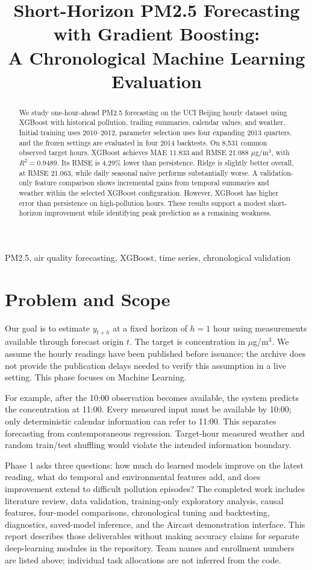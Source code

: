 \documentclass[conference]{IEEEtran}
\title{Short-Horizon PM2.5 Forecasting with Gradient Boosting:\\A Chronological Machine Learning Evaluation}
\author{\IEEEauthorblockA{\begin{tabular}{ccc}
\textbf{Samarth Khera} & \textbf{Pratham Malhotra} & \textbf{Adityaraj Pal}\\
2401010407 & 2401010343 & 2401010042\\[5pt]
\textbf{Tattva Rajput} & \textbf{Himanshu} & \\
2401010478 & 2401010188 &
\end{tabular}}\IEEEauthorblockA{CSAI Student Project 19 --- Phase 1: Machine Learning}}
\begin{document}
\maketitle
\thispagestyle{plain}
\begin{abstract}
We study one-hour-ahead PM2.5 forecasting on the UCI Beijing hourly dataset using XGBoost with historical pollution, trailing summaries, calendar values, and weather. Initial training uses 2010--2012, parameter selection uses four expanding 2013 quarters, and the frozen settings are evaluated in four 2014 backtests. On 8,531 common observed target hours, XGBoost achieves MAE 11.833 and RMSE 21.088 $\mu$g/m$^3$, with $R^2=0.9489$. Its RMSE is 4.29\% lower than persistence. Ridge is slightly better overall, at RMSE 21.063, while daily seasonal naive performs substantially worse. A validation-only feature comparison shows incremental gains from temporal summaries and weather within the selected XGBoost configuration. However, XGBoost has higher error than persistence on high-pollution hours. These results support a modest short-horizon improvement while identifying peak prediction as a remaining weakness.
\end{abstract}
\begin{IEEEkeywords}
PM2.5, air quality forecasting, XGBoost, time series, chronological validation
\end{IEEEkeywords}

\section{Problem and Scope}
Our goal is to estimate $y_{t+h}$ at a fixed horizon of $h=1$ hour using measurements available through forecast origin $t$. The target is concentration in $\mu$g/m$^3$. We assume the hourly readings have been published before issuance; the archive does not provide the publication delays needed to verify this assumption in a live setting. This phase focuses on Machine Learning.

For example, after the 10:00 observation becomes available, the system predicts the concentration at 11:00. Every measured input must be available by 10:00; only deterministic calendar information can refer to 11:00. This separates forecasting from contemporaneous regression. Target-hour measured weather and random train/test shuffling would violate the intended information boundary.

Phase 1 asks three questions: how much do learned models improve on the latest reading, what do temporal and environmental features add, and does improvement extend to difficult pollution episodes? The completed work includes literature review, data validation, training-only exploratory analysis, causal features, four-model comparisons, chronological tuning and backtesting, diagnostics, saved-model inference, and the Aircast demonstration interface. This report describes those deliverables without making accuracy claims for separate deep-learning modules in the repository. Team names and enrollment numbers are listed above; individual task allocations are not inferred from the code.
\end{document}
